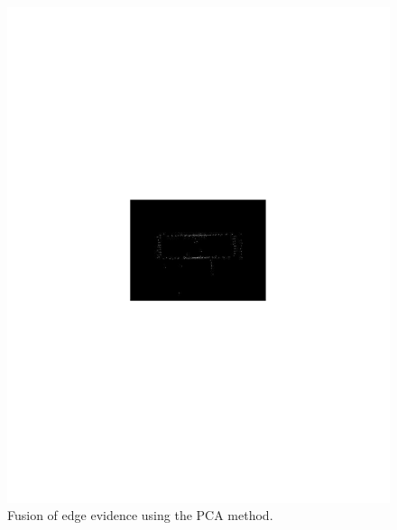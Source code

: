 \documentclass[conference]{IEEEtran}
\begin{document}
{{{{\begin{figure}[hbt]
	\includegraphics[scale=0.5]{flevoland_fusao_swt_crop.pdf}
	\caption{Fusion of edge evidence using the PCA method.}
\label{fig_07}
\end{figure}
\begin{figure}[hbt]

\end{figure}}}}}
\end{document}

